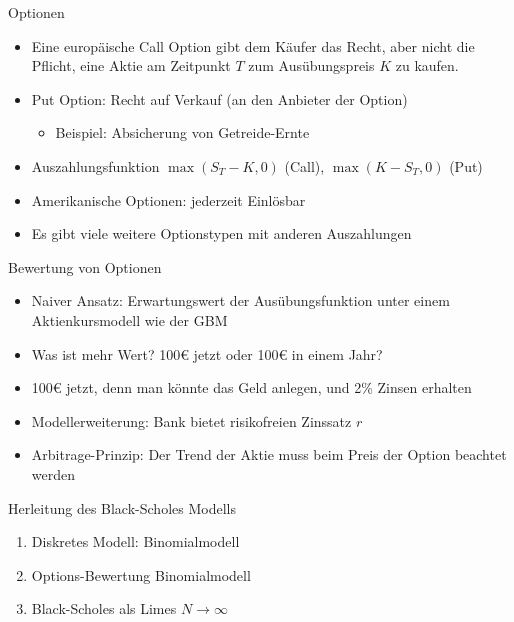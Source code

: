 \documentclass{beamer}
\begin{document}
\begin{frame}{Optionen}
  \begin{itemize}
      \item Eine europäische Call Option gibt dem Käufer das Recht, aber nicht die Pflicht, eine Aktie am Zeitpunkt $T$ zum Ausübungspreis $K$ zu kaufen.
      \item Put Option: Recht auf Verkauf (an den Anbieter der Option)
      \begin{itemize}
        \item Beispiel: Absicherung von Getreide-Ernte
      \end{itemize} 
      \item Auszahlungsfunktion $\max(S_T-K,0)$ (Call), $\max(K-S_T, 0)$ (Put)
      \item Amerikanische Optionen: jederzeit Einlösbar
      \item Es gibt viele weitere Optionstypen mit anderen Auszahlungen
  \end{itemize}
\end{frame}

\begin{frame}{Bewertung von Optionen}
  \begin{itemize}
      \item Naiver Ansatz: Erwartungswert der Ausübungsfunktion unter einem Aktienkursmodell wie der GBM
      \pause
      \item Was ist mehr Wert? 100€ jetzt oder 100€ in einem Jahr?
      \pause
      \item 100€ jetzt, denn man könnte das Geld anlegen, und 2\% Zinsen erhalten
      \item Modellerweiterung: Bank bietet risikofreien Zinssatz $r$
      \pause
      \item Arbitrage-Prinzip: Der Trend der Aktie muss beim Preis der Option beachtet werden 
  \end{itemize}
\end{frame}

\begin{frame}{Herleitung des Black-Scholes Modells}
  \begin{enumerate}
      \item Diskretes Modell: Binomialmodell
      \item Options-Bewertung Binomialmodell
      \item Black-Scholes als Limes $N \to \infty$
  \end{enumerate}
\end{frame}
\end{document}

